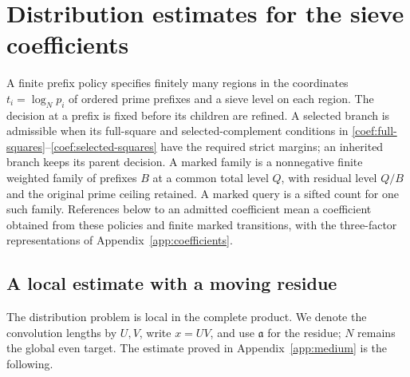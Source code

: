 \section{Distribution estimates for the sieve coefficients}
\label{sec:current-distribution}

\begin{definition}
A finite prefix policy specifies finitely many regions in the
coordinates $t_i=\log_Np_i$ of ordered prime prefixes and a sieve level
on each region. The decision at a prefix is fixed before its children
are refined. A selected branch is admissible when its full-square and
selected-complement conditions in
\eqref{coef:full-squares}--\eqref{coef:selected-squares} have the required
strict margins; an inherited branch keeps its parent decision.
A marked family is a nonnegative finite weighted family of prefixes
$B$ at a common total level $Q$, with residual level $Q/B$ and the
original prime ceiling retained. A marked query is a sifted count for
one such family. References below to an admitted coefficient mean a
coefficient obtained from these policies and finite marked transitions,
with the three-factor representations of
Appendix~\ref{app:coefficients}.
\end{definition}

\subsection{A local estimate with a moving residue}

The distribution problem is local in the complete product. We denote
the convolution lengths by $U,V$, write $x=UV$, and use $\mathfrak a$
for the residue; $N$ remains the global even target.
The estimate proved in Appendix~\ref{app:medium} is the following.

